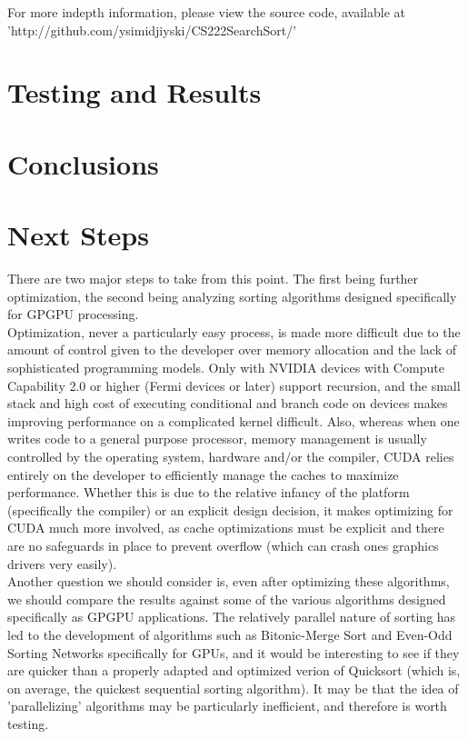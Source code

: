 \documentclass{article}
\begin{document}
For more indepth information, please view the source code, available at\\ 'http://github.com/ysimidjiyski/CS222SearchSort/'

\section{Testing and Results}
\section{Conclusions}
\section{Next Steps}
There are two major steps to take from this point. The first being further optimization, the second being analyzing sorting algorithms designed specifically for GPGPU processing.\\
Optimization, never a particularly easy process, is made more difficult due to the amount of control given to the developer over memory allocation and the lack of sophisticated programming models. Only with NVIDIA devices with Compute Capability 2.0 or higher (Fermi devices or later) support recursion, and the small stack and high cost of executing conditional and branch code on devices makes improving performance on a complicated kernel difficult. Also, whereas when one writes code to a general purpose processor, memory management is usually controlled by the operating system, hardware and/or the compiler, CUDA relies entirely on the developer to efficiently manage the caches to maximize performance. Whether this is due to the relative infancy of the platform (specifically the compiler) or an explicit design decision, it makes optimizing for CUDA much more involved, as cache optimizations must be explicit and there are no safeguards in place to prevent overflow (which can crash ones graphics drivers very easily).\\
Another question we should consider is, even after optimizing these algorithms, we should compare the results against some of the various algorithms designed specifically as GPGPU applications. The relatively parallel nature of sorting has led to the development of algorithms such as Bitonic-Merge Sort and Even-Odd Sorting Networks specifically for GPUs, and it would be interesting to see if they are quicker than a properly adapted and optimized verion of Quicksort (which is, on average, the quickest sequential sorting algorithm). It may be that the idea of 'parallelizing' algorithms may be particularly inefficient, and therefore is worth testing.
\end{document}
